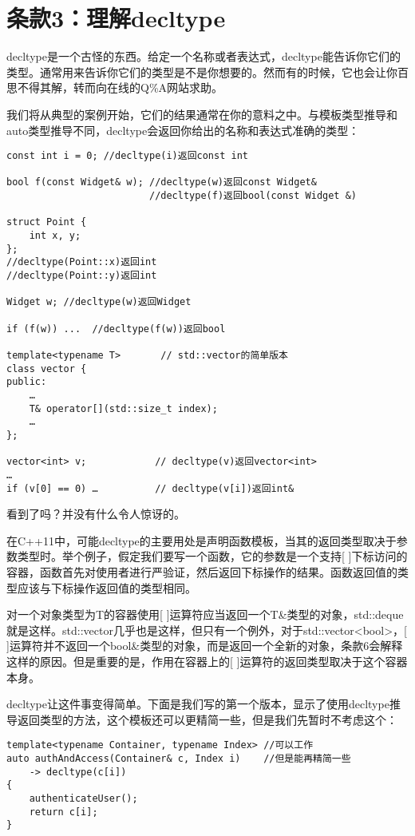 \section{条款3：理解decltype}

decltype是一个古怪的东西。给定一个名称或者表达式，decltype能告诉你它们的类型。通常用来告诉你它们的类型是不是你想要的。然而有的时候，它也会让你百思不得其解，转而向在线的Q\%A网站求助。

我们将从典型的案例开始，它们的结果通常在你的意料之中。与模板类型推导和auto类型推导不同，decltype会返回你给出的名称和表达式准确的类型：

\begin{lstlisting}
const int i = 0; //decltype(i)返回const int

bool f(const Widget& w); //decltype(w)返回const Widget&
                         //decltype(f)返回bool(const Widget &)
                         
struct Point {
	int x, y;
}; 
//decltype(Point::x)返回int
//decltype(Point::y)返回int

Widget w; //decltype(w)返回Widget

if (f(w)) ...  //decltype(f(w))返回bool

template<typename T>       // std::vector的简单版本 
class vector { 
public: 
	… 
	T& operator[](std::size_t index); 
	… 
}; 

vector<int> v;            // decltype(v)返回vector<int> 
… 
if (v[0] == 0) …          // decltype(v[i])返回int&

\end{lstlisting}

看到了吗？并没有什么令人惊讶的。

在C++11中，可能decltype的主要用处是声明函数模板，当其的返回类型取决于参数类型时。举个例子，假定我们要写一个函数，它的参数是一个支持[ ]下标访问的容器，函数首先对使用者进行严验证，然后返回下标操作的结果。函数返回值的类型应该与下标操作返回值的类型相同。

对一个对象类型为T的容器使用[ ]运算符应当返回一个T\&类型的对象，std::deque就是这样。std::vector几乎也是这样，但只有一个例外，对于std::vector<bool>，[ ]运算符并不返回一个bool\&类型的对象，而是返回一个全新的对象，条款6会解释这样的原因。但是重要的是，作用在容器上的[ ]运算符的返回类型取决于这个容器本身。

decltype让这件事变得简单。下面是我们写的第一个版本，显示了使用decltype推导返回类型的方法，这个模板还可以更精简一些，但是我们先暂时不考虑这个：

\begin{lstlisting}
template<typename Container, typename Index> //可以工作 
auto authAndAccess(Container& c, Index i)    //但是能再精简一些
	-> decltype(c[i])                            
{ 
	authenticateUser(); 
	return c[i]; 
}
\end{lstlisting}

